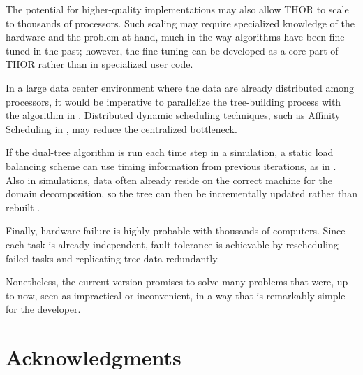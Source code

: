 \documentclass[twoside,leqno,twocolumn]{article}
\begin{document}
The potential for higher-quality implementations may also allow THOR to scale to thousands of processors.
Such scaling may require specialized knowledge of the hardware and the problem at hand, much in the way algorithms have been fine-tuned in the past; however, the fine tuning can be developed as a core part of THOR rather than in specialized user code.

In a large data center environment where the data are already distributed among processors, it would be imperative to parallelize the tree-building process with the algorithm in \cite{alfuraih00parallel}.
Distributed dynamic scheduling techniques, such as Affinity Scheduling in \cite{markatos92using}, may reduce the centralized bottleneck.

If the dual-tree algorithm is run each time step in a simulation, a static load balancing scheme can use timing information from previous iterations, as in \cite{liu94experiences, salmon_thesis, singh_thesis}.
Also in simulations, data often already reside on the correct machine for the domain decomposition, so the tree can then be incrementally updated rather than rebuilt \cite{liu94experiences}.

Finally, hardware failure is highly probable with thousands of computers.
Since each task is already independent, fault tolerance is achievable by rescheduling failed tasks and replicating tree data redundantly.

Nonetheless, the current version promises to solve many problems that were, up to now, seen as impractical or inconvenient, in a way that is remarkably simple for the developer.

\section{Acknowledgments}
\end{document}
